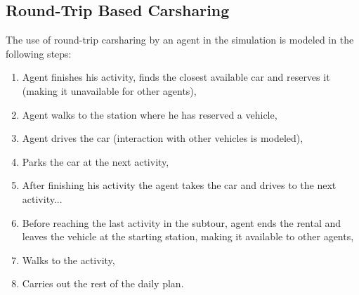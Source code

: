 \subsection{Round-Trip Based Carsharing}
The use of round-trip carsharing by an agent in the simulation is modeled in the following steps: 
\begin{enumerate}
	\item Agent finishes his activity, finds the closest available car and reserves it (making it unavailable for other agents),
	\item Agent walks to the station where he has reserved a vehicle,
	\item Agent drives the car (interaction with other vehicles is modeled),
	\item Parks the car at the next activity,
	\item After finishing his activity the agent takes the car and drives to the next activity...
	\item Before reaching the last activity in the subtour, agent ends the rental and leaves the vehicle at the starting station, making it available to other agents,
	\item Walks to the activity,
	\item Carries out the rest of the daily plan.
\end{enumerate}

